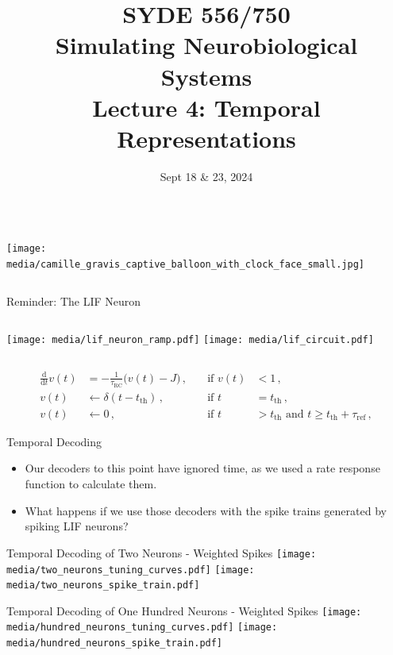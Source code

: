 \documentclass[handout,aspectratio=169]{beamer}
\date{Sept 18 \& 23, 2024}
\title{SYDE 556/750 \\ Simulating Neurobiological Systems \\ Lecture 4: Temporal Representations}
\begin{document}
\begin{frame}{}
	\vspace{0.5cm}
	\begin{columns}[c]
		\MakeTitle
		\texttt{[image: media/camille\_gravis\_captive\_balloon\_with\_clock\_face\_small.jpg]}
	\end{columns}
\end{frame}

\begin{frame}{Reminder: The LIF Neuron}
	\begin{columns}[c]
		\texttt{[image: media/lif\_neuron\_ramp.pdf]}
		\texttt{[image: media/lif\_circuit.pdf]}
	\end{columns}
	\begin{align*}
		\frac{\mathrm{d}}{\mathrm{d}t} v(t) &= -\frac{1}{\tau_\mathrm{RC}} \big( v(t) - J \big) \,, \quad &\text{if } v(t) &< 1\,, \\
		v(t) &\gets \delta(t - t_\mathrm{th}) \,, &\text{if } t &= t_\mathrm{th} \,,\\
		v(t) &\gets 0 \,, &\text{if } t &> t_\mathrm{th} \text{ and } t \geq t_\mathrm{th} + \tau_\mathrm{ref} \,,
	\end{align*}
\end{frame}

\begin{frame}{Temporal Decoding}
	\begin{itemize}
		\setlength{\itemsep}{0.25cm}
		\item Our decoders to this point have ignored time, as we used a rate response function to calculate them.
		\item <2->What happens if we use those decoders with the spike trains generated by spiking LIF neurons?
    \end{itemize}
\end{frame}

\begin{frame}{Temporal Decoding of Two Neurons - Weighted Spikes}
	\texttt{[image: media/two\_neurons\_tuning\_curves.pdf]}%
	\texttt{[image: media/two\_neurons\_spike\_train.pdf]}
\end{frame}

\begin{frame}{Temporal Decoding of One Hundred Neurons - Weighted Spikes}
	\texttt{[image: media/hundred\_neurons\_tuning\_curves.pdf]}%
	\texttt{[image: media/hundred\_neurons\_spike\_train.pdf]}
\end{frame}
\end{document}
